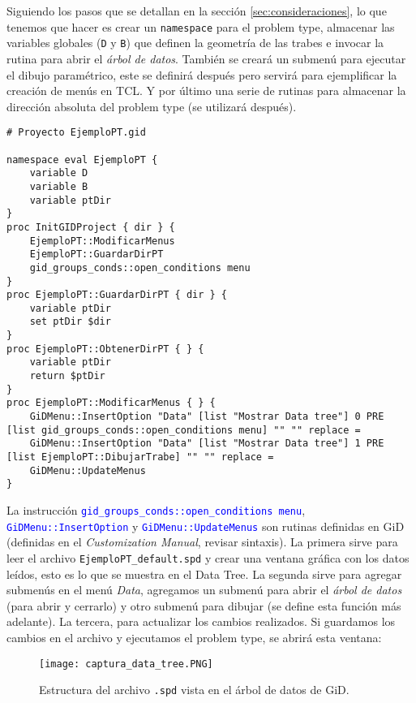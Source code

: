 \documentclass[10pt, a4paper, twocolumn]{article} %
\begin{document}
Siguiendo los pasos que se detallan en la sección \ref{sec:consideraciones}, lo que tenemos que hacer es crear un \texttt{namespace} para el problem type, almacenar las variables globales (\texttt{D} y \texttt{B}) que definen la geometría de las trabes e invocar la rutina para abrir el \textit{árbol de datos}. También se creará un submenú para ejecutar el dibujo paramétrico, este se definirá después pero servirá para ejemplificar la creación de menús en TCL. Y por último una serie de rutinas para almacenar la dirección absoluta del problem type (se utilizará después).

\lstset{language=tcl} 
\begin{lstlisting}[caption={Código para inicializar el proyecto y crear el menú.}]
# Proyecto EjemploPT.gid

namespace eval EjemploPT {
	variable D
	variable B
	variable ptDir
}
proc InitGIDProject { dir } {
	EjemploPT::ModificarMenus
	EjemploPT::GuardarDirPT
	gid_groups_conds::open_conditions menu
}
proc EjemploPT::GuardarDirPT { dir } {
	variable ptDir
	set ptDir $dir
}
proc EjemploPT::ObtenerDirPT { } {
	variable ptDir
	return $ptDir
}
proc EjemploPT::ModificarMenus { } {
	GiDMenu::InsertOption "Data" [list "Mostrar Data tree"] 0 PRE [list gid_groups_conds::open_conditions menu] "" "" replace =
	GiDMenu::InsertOption "Data" [list "Mostrar Data tree"] 1 PRE [list EjemploPT::DibujarTrabe] "" "" replace =
    GiDMenu::UpdateMenus
}
\end{lstlisting}

La instrucción \textcolor{blue}{\texttt{gid\_groups\_conds::open\_conditions menu}}, \textcolor{blue}{\texttt{GiDMenu::InsertOption}} y \textcolor{blue}{\texttt{GiDMenu::UpdateMenus}} son rutinas definidas en GiD (definidas en el \textit{Customization Manual}, revisar sintaxis). La primera sirve para leer el archivo \texttt{EjemploPT\_default.spd} y crear una ventana gráfica con los datos leídos, esto es lo que se muestra en el Data Tree. La segunda sirve para agregar submenús en el menú \textit{Data}, agregamos un submenú para abrir el \textit{árbol de datos} (para abrir y cerrarlo) y otro submenú para dibujar (se define esta función más adelante). La tercera, para actualizar los cambios realizados. Si guardamos los cambios en el archivo y ejecutamos el problem type, se abrirá esta ventana:

\begin{figure}[hbt!]\centering
	\texttt{[image: captura\_data\_tree.PNG]}
	\label{fig:estructura_spd}
	\caption{Estructura del archivo \texttt{.spd} vista en el árbol de datos de GiD.}
\end{figure}
\end{document}
